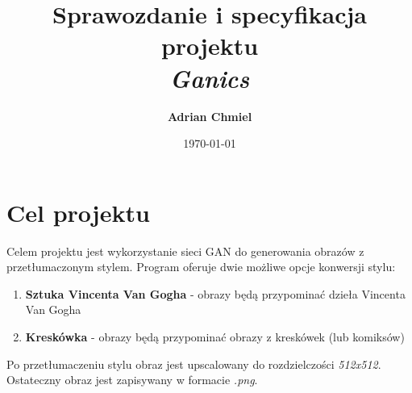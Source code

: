 \documentclass{article}
\begin{document}
\title{\textbf{Sprawozdanie i specyfikacja projektu}
\\ \large{\textit{Ganics}}}
\author{\textbf{Adrian Chmiel}}
\date{\today}
\maketitle

\section{Cel projektu}
Celem projektu jest wykorzystanie sieci GAN do generowania obrazów z przetłumaczonym stylem. Program oferuje dwie możliwe opcje konwersji stylu:
\begin{enumerate}[label=\arabic*.]
    \setlength\itemsep{0pt}
    \item \textbf{Sztuka Vincenta Van Gogha} - obrazy będą przypominać dzieła Vincenta Van Gogha
    \item \textbf{Kreskówka} - obrazy będą przypominać obrazy z kreskówek (lub komiksów)
\end{enumerate}
Po przetłumaczeniu stylu obraz jest upscalowany do rozdzielczości \textit{512x512}. Ostateczny obraz jest zapisywany w formacie \textit{.png}.
\end{document}
